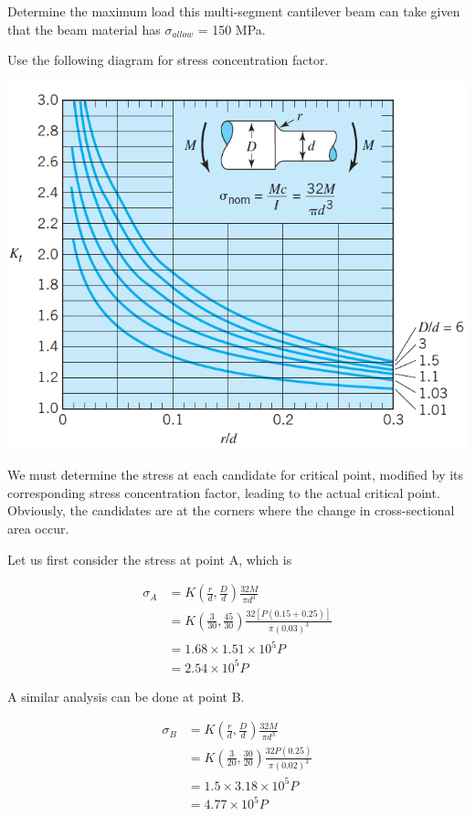 \documentclass[a4paper,openany,nobib]{tufte-book}
\begin{document}
Determine the maximum load this multi-segment cantilever beam can take
given that the beam material has \(\sigma_{allow}\) = 150 MPa.


Use the following diagram for stress concentration factor.


\begin{center}
\includegraphics[width=.9\linewidth]{pictures/Static-body-load-analysis/stress-conc-shaft-shoulder-fillet-bending.png}
\end{center}

We must determine the stress at each candidate for critical point,
modified by its corresponding stress concentration factor, leading to
the actual critical point. Obviously, the candidates are at the corners
where the change in cross-sectional area occur.

Let us first consider the stress at point A, which is

$$\begin{aligned}
    \sigma_A &= K(\frac{r}{d}, \frac{D}{d}) \frac{32M}{\pi d^3} \\
             &= K(\frac{3}{30}, \frac{45}{30}) \frac{32[P(0.15 + 0.25)]}{\pi (0.03)^3} \\
             &= 1.68 \times 1.51 \times 10^5 P \\
             &= 2.54 \times 10^5 P
  \end{aligned}$$

A similar analysis can be done at point B.

$$\begin{aligned}
    \sigma_B &= K(\frac{r}{d}, \frac{D}{d}) \frac{32M}{\pi d^3} \\
             &= K(\frac{3}{20}, \frac{30}{20}) \frac{32P(0.25)}{\pi (0.02)^3} \\
             &= 1.5 \times 3.18 \times 10^5 P \\
             &= 4.77 \times 10^5 P
  \end{aligned}$$
\end{document}
